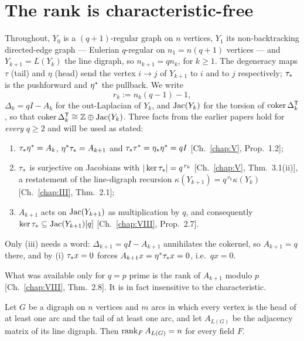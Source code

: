 \section{The rank is characteristic-free}\label{XVII:sec:rank}

Throughout, $Y_0$ is a $(q+1)$-regular graph on $n$ vertices, $Y_1$ its non-backtracking
directed-edge graph --- Eulerian $q$-regular on $n_1=n(q+1)$ vertices --- and
$Y_{k+1}=L(Y_k)$ the line digraph, so $n_{k+1}=qn_k$, for $k\ge1$. The degeneracy maps
$\tau$ (tail) and $\eta$ (head) send the vertex $i\to j$ of $Y_{k+1}$ to $i$ and to $j$
respectively; $\tau_*$ is the pushforward and $\eta^*$ the pullback. We write
\[
r_k:=n_k(q-1)-1 ,
\]
$\Delta_k=qI-A_k$ for the out-Laplacian of $Y_k$, and $\operatorname{Jac}(Y_k)$ for the torsion of
$\operatorname{coker}\Delta_k^{\mathsf T}$, so that $\operatorname{coker}\Delta_k^{\mathsf T}\cong\mathbb{Z}\oplus\operatorname{Jac}(Y_k)$.
Three facts from the earlier papers hold for \emph{every} $q\ge2$ and will be used as
stated:
\begin{enumerate}
\item[(i)] $\tau_*\eta^*=A_k$, $\eta^*\tau_*=A_{k+1}$ and $\tau_*\tau^*=\eta_*\eta^*=qI$
      [Ch.~\ref{chap:V}, Prop.~1.2];
\item[(ii)] $\tau_*$ is surjective on Jacobians with $|\ker\tau_*|=q^{\,r_k}$
      [Ch.~\ref{chap:V}, Thm.~3.1(ii)], a restatement of the line-digraph recursion
      $\kappa(Y_{k+1})=q^{\,r_k}\kappa(Y_k)$ [Ch.~\ref{chap:III}, Thm.~2.1];
\item[(iii)] $A_{k+1}$ acts on $\operatorname{Jac}(Y_{k+1})$ as multiplication by $q$, and consequently
      $\ker\tau_*\subseteq\operatorname{Jac}(Y_{k+1})[q]$ [Ch.~\ref{chap:VIII}, Prop.~2.7].
\end{enumerate}
Only (iii) needs a word: $\Delta_{k+1}=qI-A_{k+1}$ annihilates the cokernel, so $A_{k+1}=q$
there, and by (i) $\tau_* x=0$ forces $A_{k+1}x=\eta^*\tau_* x=0$, i.e.\ $qx=0$.

What was available only for $q=p$ prime is the rank of $A_{k+1}$ modulo $p$
[Ch.~\ref{chap:VIII}, Thm.~2.8]. It is in fact insensitive to the characteristic.

\begin{lemma}\label{XVII:lem:rank}
Let $G$ be a digraph on $n$ vertices and $m$ arcs in which every vertex is the head of at
least one arc and the tail of at least one arc, and let $A_{L(G)}$ be the adjacency matrix
of its line digraph. Then $\operatorname{rank}_F A_{L(G)}=n$ for every field $F$.
\end{lemma}

